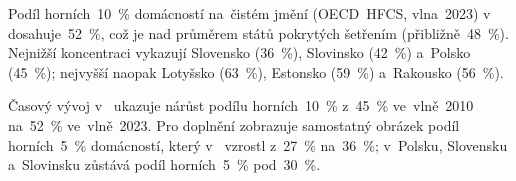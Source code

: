 Podíl horních~10~\% domácností na~čistém jmění (\acs{OECD}~\acs{HFCS}, vlna~2023) v~ dosahuje~\SI{52}{\percent}, což je nad průměrem států pokrytých šetřením (přibližně~\SI{48}{\percent}). Nejnižší koncentraci vykazují Slovensko (\SI{36}{\percent}), Slovinsko (\SI{42}{\percent}) a~Polsko (\SI{45}{\percent}); nejvyšší naopak Lotyšsko (\SI{63}{\percent}), Estonsko (\SI{59}{\percent}) a~Rakousko (\SI{56}{\percent}).

Časový vývoj v~ ukazuje nárůst podílu horních~10~\% z~\SI{45}{\percent} ve~vlně~2010 na~\SI{52}{\percent} ve~vlně~2023. Pro doplnění zobrazuje samostatný obrázek podíl horních~5~\% domácností, který v~ vzrostl z~\SI{27}{\percent} na~\SI{36}{\percent}; v~Polsku, Slovensku a~Slovinsku zůstává podíl horních~5~\% pod~\SI{30}{\percent}.


